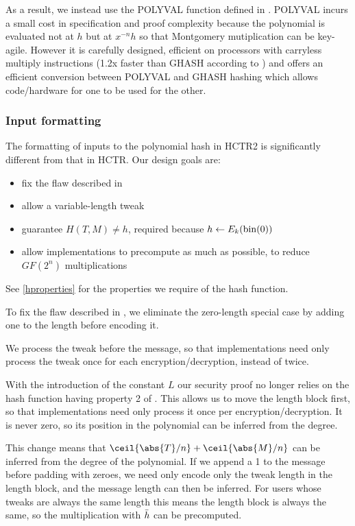 \documentclass[hctr.tex]{subfiles}
\begin{document}
As a result, we instead use the POLYVAL function
defined in \cite{aes_gcm_siv,aes_gcm_siv_rfc}.
POLYVAL incurs a small cost in specification and proof complexity because 
the polynomial is evaluated not at \(h\) but at \(x^{-n}h\)
so that Montgomery mutiplication\cite{montmul} can be key-agile.
However it is carefully designed, efficient
on processors with carryless multiply instructions
(1.2x faster than GHASH according to \cite{aes_gcm_siv})
and offers an efficient conversion between POLYVAL and GHASH hashing
which allows code/hardware for one to be used for the other.

\subsubsection{Input formatting}

The formatting of inputs to the polynomial hash in HCTR2 is significantly
different from that in HCTR. Our design goals are:

\begin{itemize}
    \item fix the flaw described in \cite{kumarhctr}
    \item allow a variable-length tweak
    \item guarantee \(H(T, M) \neq h\), required
    because \(h \gets E_k(\operatorname{bin}(0))\)
    \item allow implementations to precompute as much as possible, to reduce \(GF(2^n)\) multiplications
\end{itemize}

See \autoref{hproperties}
for the properties we require of the hash function.

To fix the flaw described in \cite{kumarhctr},
we eliminate the zero-length special case
by adding one to the length before encoding it.

We process the tweak before the message, so that implementations need only
process the tweak once for each encryption/decryption, instead of twice.

With the introduction of the constant \(L\)
our security proof no longer relies on the hash function
having property 2 of \cite[Section~3.3]{hctr}.
This allows us to move the length block first, so
that implementations need only process it once per encryption/decryption.
It is never zero, so its position in the
polynomial can be inferred from the degree.

This change means that \(\ceil{\abs{T}/n} + \ceil{\abs{M}/n}\)
can be inferred from the degree of the polynomial.  
If we append a 1 to the message before padding with zeroes,
we need only encode only the tweak length in the length block,
and the message length can then be inferred.
For users whose tweaks are always the same length
this means the length block is always the same, 
so the multiplication with \(\bar{h}\) can be
precomputed.
\end{document}
